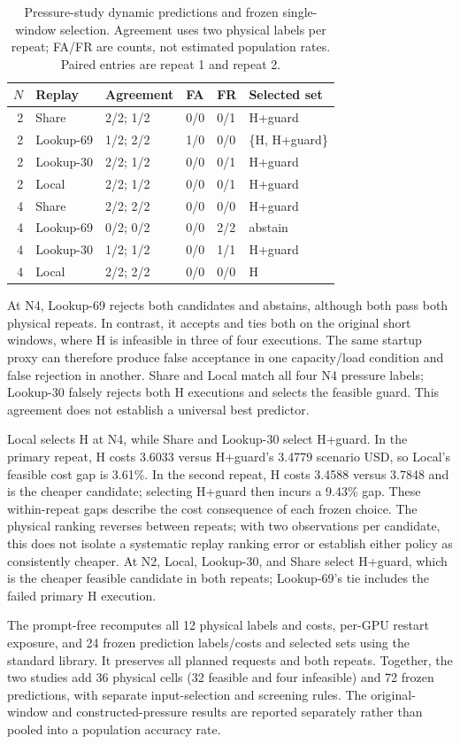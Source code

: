 \begin{table}[t]
\centering\small
\caption{Pressure-study dynamic predictions and frozen single-window selection.
Agreement uses two physical labels per repeat; FA/FR are counts, not
estimated population rates. Paired entries are repeat 1 and repeat 2.}
\label{tab:pressure-prediction}
\setlength{\tabcolsep}{3pt}
\begin{tabular*}{\linewidth}{@{\extracolsep{\fill}}rlllll@{}}
\toprule
$N$ & Replay & Agreement & FA & FR & Selected set\\
\midrule
2 & Share & 2/2; 1/2 & 0/0 & 0/1 & H+guard \\
2 & Lookup-69 & 1/2; 2/2 & 1/0 & 0/0 & \{H, H+guard\} \\
2 & Lookup-30 & 2/2; 1/2 & 0/0 & 0/1 & H+guard \\
2 & Local & 2/2; 1/2 & 0/0 & 0/1 & H+guard \\
\midrule
4 & Share & 2/2; 2/2 & 0/0 & 0/0 & H+guard \\
4 & Lookup-69 & 0/2; 0/2 & 0/0 & 2/2 & abstain \\
4 & Lookup-30 & 1/2; 1/2 & 0/0 & 1/1 & H+guard \\
4 & Local & 2/2; 2/2 & 0/0 & 0/0 & H \\
\bottomrule
\end{tabular*}
\end{table}

At N4, Lookup-69 rejects both candidates and abstains, although both pass
both physical repeats. In contrast, it accepts and ties both on the original
short windows, where H is infeasible in three of four executions.
The same startup proxy can therefore produce false acceptance in one
capacity/load condition and false rejection in another.
Share and Local match all four N4 pressure labels; Lookup-30 falsely
rejects both H executions and selects the feasible guard.
This agreement does not establish a universal best predictor.

Local selects H at N4, while Share and Lookup-30 select H+guard.
In the primary repeat, H costs 3.6033 versus H+guard's 3.4779 scenario USD,
so Local's feasible cost gap is 3.61\%. In the second repeat, H costs
3.4588 versus 3.7848 and is the cheaper candidate; selecting H+guard then
incurs a 9.43\% gap. These within-repeat gaps describe the cost consequence
of each frozen choice. The physical ranking reverses between repeats;
with two observations per candidate, this does not isolate a systematic replay
ranking error or establish either policy as consistently cheaper.
At N2, Local, Lookup-30, and Share select H+guard, which is the cheaper
feasible candidate in both repeats; Lookup-69's tie includes the failed
primary H execution.

The prompt-free  recomputes all
12 physical labels and costs, per-GPU restart exposure, and 24 frozen
prediction labels/costs and selected sets using the standard library.
It preserves all planned requests and both repeats. Together, the two
studies add 36 physical cells (32 feasible and four infeasible) and 72
frozen predictions, with separate input-selection and screening rules.
The original-window and constructed-pressure results are reported
separately rather than pooled into a population accuracy rate.
